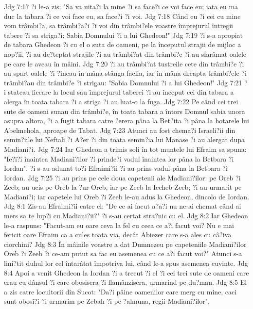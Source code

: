 Jdg 7:17  ?i le-a zis: "Sa va uita?i la mine ?i sa face?i ce voi face eu; iata eu ma duc la tabara ?i ce voi face eu, sa face?i ?i voi.
Jdg 7:18  Când eu ?i cei cu mine vom trâmbi?a, sa trâmbi?a?i ?i voi din trâmbi?ele voastre împrejurul întregii tabere ?i sa striga?i: Sabia Domnului ?i a lui Ghedeon!"
Jdg 7:19  ?i s-a apropiat de tabara Ghedeon ?i cu el o suta de oameni, pe la începutul strajii de mijloc a nop?ii, ?i au de?teptat strajile ?i au trâmbi?at din trâmbi?e ?i au sfarâmat oalele pe care le aveau în mâini.
Jdg 7:20  ?i au trâmbi?at tustreile cete din trâmbi?e ?i au spart oalele ?i ?ineau în mâna stânga faclia, iar în mâna dreapta trâmbi?ele ?i trâmbi?au din trâmbi?e ?i strigau: "Sabia Domnului ?i a lui Ghedeon!"
Jdg 7:21  ?i stateau fiecare la locul sau împrejurul taberei ?i au început cei din tabara a alerga în toata tabara ?i a striga ?i au luat-o la fuga.
Jdg 7:22  Pe când cei trei sute de oameni sunau din trâmbi?e, în toata tabara a întors Domnul sabia unora asupra altora, ?i a fugit tabara catre ?erera pâna la Bet?ita ?i pâna la hotarele lui Abelmehola, aproape de Tabat.
Jdg 7:23  Atunci au fost chema?i Israeli?ii din semin?iile lui Neftali ?i A?er ?i din toata semin?ia lui Manase ?i au alergat dupa Madiani?i.
Jdg 7:24  Iar Ghedeon a trimis soli în tot muntele lui Efraim sa spuna: "Ie?i?i înaintea Madiani?ilor ?i prinde?i vadul înaintea lor pâna la Betbara ?i Iordan". ?i s-au adunat to?i Efraimi?ii ?i au prins vadul pâna la Betbara ?i Iordan.
Jdg 7:25  ?i au prins pe cele doua capetenii ale Madiani?ilor: pe Oreb ?i Zeeb; au ucis pe Oreb la ?ur-Oreb, iar pe Zeeb la Iecheb-Zeeb; ?i au urmarit pe Madiani?i; iar capetele lui Oreb ?i Zeeb le-au adus la Ghedeon, dincolo de Iordan.
Jdg 8:1  Zis-au Efraimi?ii catre el: "De ce ai facut a?a?i nu ne-ai chemat când ai mers sa te lup?i cu Madiani?ii?" ?i s-au certat stra?nic cu el.
Jdg 8:2  Iar Ghedeon le-a raspuns: "Facut-am eu oare ceva la fel cu ceea ce a?i facut voi? Nu e mai fericit oare Efraim ca a cules toata via, decât Abiezer care s-a ales cu câ?iva ciorchini?
Jdg 8:3  În mâinile voastre a dat Dumnezeu pe capeteniile Madiani?ilor Oreb ?i Zeeb ?i ce-am putut sa fac eu asemenea cu ce a?i facut voi?" Atunci s-a lini?tit duhul lor cel întarâtat împotriva lui, când le-a spus asemenea cuvinte.
Jdg 8:4  Apoi a venit Ghedeon la Iordan ?i a trecut ?i el ?i cei trei sute de oameni care erau cu dânsul ?i care obosisera ?i flamânzisera, urmarind pe du?man.
Jdg 8:5  El a zis catre locuitorii din Sucot: "Da?i pâine oamenilor care merg cu mine, caci sunt obosi?i ?i urmarim pe Zebah ?i pe ?almuna, regii Madiani?ilor".
